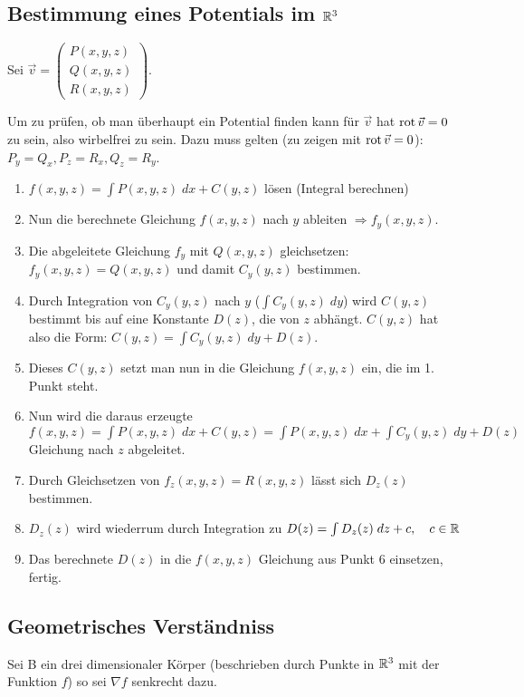 \subsection{Bestimmung eines Potentials im $\mathbb{R}^3$}
Sei $\vec{v} = \begin{pmatrix}
P(x,y,z)\\
Q(x,y,z)\\
R(x,y,z)
\end{pmatrix}$.

Um zu prüfen, ob man überhaupt ein Potential finden kann für $\vec{v}$ hat $\operatorname{rot} \vec{v} = 0$
zu sein, also wirbelfrei zu sein. Dazu muss gelten (zu zeigen mit $\operatorname{rot} \vec{v} = 0$): $P_y = Q_x, P_z = R_x, Q_z = R_y$.

\begin{enumerate}[itemsep=1em]
	\item $f(x,y,z) = \int P(x,y,z)\;dx + C(y,z)$ lösen (Integral berechnen)
	\item Nun die berechnete Gleichung $f(x,y,z)$ nach $y$ ableiten $\Rightarrow f_y(x,y,z)$.
	\item Die abgeleitete Gleichung $f_y$ mit $Q(x,y,z)$ gleichsetzen: $f_y(x,y,z) = Q(x,y,z)$
	und damit $C_y(y,z)$ bestimmen.
	\item Durch Integration von $C_y(y,z)$ nach $y$ ($\int C_y(y,z)\;dy$) wird $C(y,z)$ bestimmt
	bis auf eine Konstante $D(z)$, die von $z$ abhängt. $C(y,z)$ hat also die Form:
	$C(y,z) = \int C_y(y,z)\; dy + D(z)$.
	\item Dieses $C(y,z)$ setzt man nun in die Gleichung $f(x,y,z)$ ein, die im 1. Punkt steht.
	\item Nun wird die daraus erzeugte
	$f(x,y,z) = \int P(x,y,z)\;dx + C(y,z) = \int P(x,y,z)\;dx + \int C_y(y,z)\; dy + D(z)$
	Gleichung nach $z$ abgeleitet.
	\item Durch Gleichsetzen von $f_z(x,y,z) = R(x,y,z)$ lässt sich $D_z(z)$ bestimmen.
	\item $D_z(z)$ wird wiederrum durch Integration zu $D(z) = \int D_z(z)\; dz + c, \quad c \in \mathbb{R}$
	\item Das berechnete $D(z)$ in die $f(x,y,z)$ Gleichung aus Punkt 6 einsetzen, fertig.
\end{enumerate}

\subsection{Geometrisches Verständniss}
Sei B ein drei dimensionaler Körper (beschrieben durch Punkte in $\mathbb{R}^3$ mit der Funktion $f$) so sei $\nabla f$ senkrecht dazu.

